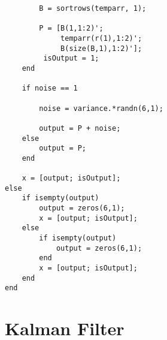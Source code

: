 \begin{lstlisting}
        B = sortrows(temparr, 1);
        
        P = [B(1,1:2)';
             temparr(r(1),1:2)';
             B(size(B,1),1:2)'];
         isOutput = 1;
    end

    if noise == 1
    
        noise = variance.*randn(6,1);
    
        output = P + noise;
    else
        output = P;
    end
    
    x = [output; isOutput];
else
    if isempty(output)
        output = zeros(6,1);
        x = [output; isOutput];
    else
        if isempty(output)
            output = zeros(6,1);
        end
        x = [output; isOutput]; 
    end
end
\end{lstlisting}


\section{Kalman Filter}


